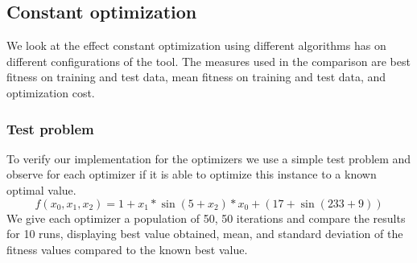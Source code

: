 \subsection{Constant optimization}
We look at the effect constant optimization using different algorithms has on different configurations of the tool. The measures used in the comparison are best fitness on training and test data, mean fitness on training and test data, and optimization cost.

\subsubsection{Test problem}
To verify our implementation for the optimizers we use a simple test problem and observe for each optimizer if it is able to optimize this instance to a known optimal value.
\[
f(x_0, x_1, x_2) = 1 + x_1 * \sin (5+x_2) * x_0 + (17 + \sin (233+9))
\]
We give each optimizer a population of 50, 50 iterations and compare the results for 10 runs, displaying best value obtained, mean, and standard deviation of the fitness values compared to the known best value.
